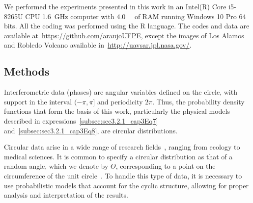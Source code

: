 \documentclass[remotesensing,article,submit,pdftex,moreauthors]{Definitions/mdpi}
\begin{document}
We performed the experiments presented in this work in an Intel(R) Core i5-8265U CPU  \qty{1.6}{\giga\hertz} computer with \qty{4.0}{\giga\byte} of RAM running Windows 10 Pro 64 bits. 
All the coding was performed using the R language. 
The codes and data are available at~\url{https://github.com/araujoUFPE}, except the images of Los Alamos and Robledo Volcano available in~\url{http://uavsar.jpl.nasa.gov/}.

\subsection{Methods}\label{subsec:methods}

Interferometric data (phases) are angular variables defined on the circle, with support in the interval $(-\pi, \pi]$ and periodicity $2\pi$. 
Thus, the probability density functions that form the basis of this work, particularly the physical models described in expressions~\eqref{subsec:sec3.2.1_cap3Eq7} and~\eqref{subsec:sec3.2.1_cap3Eq8}, are circular distributions. 


Circular data arise in a wide range of research fields~\cite{OneDirection?ATutorialforCircularDataAnalysisUsingRWithExamplesinCognitivePsychology}, ranging from ecology to medical sciences. 
It is common to specify a circular distribution as that of a random angle, which we denote by $\Theta$, corresponding to a point on the circumference of the unit circle~\cite{CircularStatisticsinR}. 
To handle this type of data, it is necessary to use probabilistic models that account for the cyclic structure, allowing for proper analysis and interpretation of the results.
\end{document}
